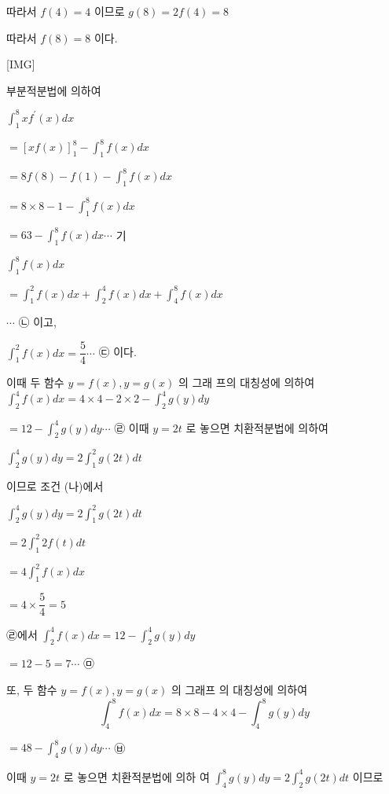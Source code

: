 \documentclass{oblivoir}
\begin{document}
따라서 $f(4)=4$ 이므로
$g(8)=2 f(4)=8$

따라서 $f(8)=8$ 이다.

[IMG]

부분적분법에 의하여

$\displaystyle\int_{1}^{8} x f^{\prime}(x) d x$

$=[x f(x)]_{1}^{8}-\displaystyle\int_{1}^{8} f(x) d x$

$=8 f(8)-f(1)-\displaystyle\int_{1}^{8} f(x) d x$

$=8 \times 8-1-\displaystyle\int_{1}^{8} f(x) d x$

$=63-\displaystyle\int_{1}^{8} f(x) d x \cdots$ 기

$\displaystyle\int_{1}^{8} f(x) d x$

$=\displaystyle\int_{1}^{2} f(x) d x+\displaystyle\int_{2}^{4} f(x) d x+\displaystyle\int_{4}^{8} f(x) d x$

$\cdots$ ㉡
이고,

$\displaystyle\int_{1}^{2} f(x) d x=\dfrac{5}{4} \cdots$ ㉢
이다.

이때 두 함수 $y=f(x), y=g(x)$ 의 그래
프의 대칭성에 의하여
$\displaystyle\int_{2}^{4} f(x) d x=4 \times 4-2 \times 2-\displaystyle\int_{2}^{4} g(y) d y$

$=12-\displaystyle\int_{2}^{4} g(y) d y \cdots$ ㉣
이때 $y=2 t$ 로 놓으면 치환적분법에 의하여

$\displaystyle\int_{2}^{4} g(y) d y=2 \displaystyle\int_{1}^{2} g(2 t) d t$

이므로 조건 (나)에서

$\displaystyle\int_{2}^{4} g(y) d y=2 \displaystyle\int_{1}^{2} g(2 t) d t$

$=2 \displaystyle\int_{1}^{2} 2 f(t) d t$

$=4 \displaystyle\int_{1}^{2} f(x) d x$

$=4 \times \dfrac{5}{4}=5$

㉣에서
$\displaystyle\int_{2}^{4} f(x) d x=12-\displaystyle\int_{2}^{4} g(y) d y$

$=12-5=7 \cdots$ ㉤

또, 두 함수 $y=f(x), y=g(x)$ 의 그래프 의 대칭성에 의하여
$$
\displaystyle\int_{4}^{8} f(x) d x=8 \times 8-4 \times 4-\displaystyle\int_{4}^{8} g(y) d y
$$

$=48-\displaystyle\int_{4}^{8} g(y) d y \cdots$ ㉥

이때 $y=2 t$ 로 놓으면 치환적분법에 의하 여 $\displaystyle\int_{4}^{8} g(y) d y=2 \displaystyle\int_{2}^{4} g(2 t) d t$ 이므로 
\end{document}
